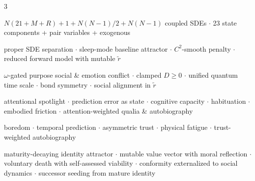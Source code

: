 \documentclass[8pt,landscape]{extarticle}
\newcommand{\fix}[1]{\textcolor{fixcolor}{#1}}
\newcommand{\vnew}[1]{\textcolor{v13color}{#1}}
\newcommand{\vfour}[1]{\textcolor{v14color}{#1}}
\newcommand{\vfive}[1]{\textcolor{v15color}{#1}}
\begin{document}
\begin{multicols}{3}
\medskip
{\scriptsize \vfive{$N(21+M+R) + 1 + N(N{-}1)/2 + N(N{-}1)$ coupled SDEs $\cdot$ 23 state components + pair variables + exogenous}

proper SDE separation $\cdot$ sleep-mode baseline attractor $\cdot$ $C^2$-smooth penalty $\cdot$ reduced forward model with mutable $\tilde r$

\fix{$\omega$-gated purpose social \& emotion conflict $\cdot$ clamped $D\ge0$ $\cdot$ unified quantum time scale $\cdot$ bond symmetry $\cdot$ social alignment in $\tilde r$}

\vnew{attentional spotlight $\cdot$ prediction error as state $\cdot$ cognitive capacity $\cdot$ habituation $\cdot$ embodied friction $\cdot$ attention-weighted qualia \& autobiography}

\vfour{boredom $\cdot$ temporal prediction $\cdot$ asymmetric trust $\cdot$ physical fatigue $\cdot$ trust-weighted autobiography}

\vfive{maturity-decaying identity attractor $\cdot$ mutable value vector with moral reflection $\cdot$ voluntary death with self-assessed viability $\cdot$ conformity externalized to social dynamics $\cdot$ successor seeding from mature identity}}

\end{multicols}
\end{document}
